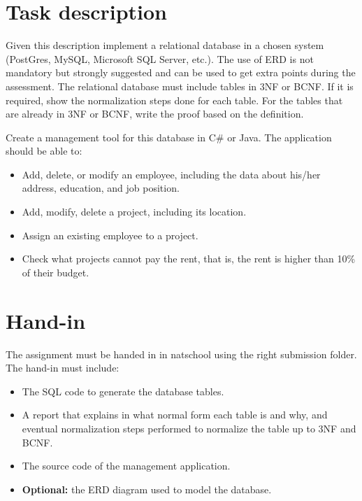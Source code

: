 \documentclass[10pt,a4paper]{article}
\begin{document}
\section*{Task description}
Given this description implement a relational database in a chosen system (PostGres, MySQL, Microsoft SQL Server, etc.). The use of ERD is not mandatory but strongly suggested and can be used to get extra points during the assessment. The relational database must include tables in 3NF or BCNF. If it is required, show the normalization steps done for each table. For the tables that are already in 3NF or BCNF, write the proof based on the definition.

\noindent
Create a management tool for this database in C\# or Java. The application should be able to:

\begin{itemize}
	\item Add, delete, or modify an employee, including the data about his/her address, education, and job position.
	\item Add, modify, delete a project, including its location.
	\item Assign an existing employee to a project.
	\item Check what projects cannot pay the rent, that is, the rent is higher than 10\% of their budget.
\end{itemize}

\section*{Hand-in}
The assignment must be handed in in natschool using the right submission folder. The hand-in must include:
\begin{itemize}
	\item The SQL code to generate the database tables.
	\item A report that explains in what normal form each table is and why, and eventual normalization steps performed to normalize the table up to 3NF and BCNF.
	\item The source code of the management application.
	\item \textbf{Optional:} the ERD diagram used to model the database.
\end{itemize}
\end{document}
